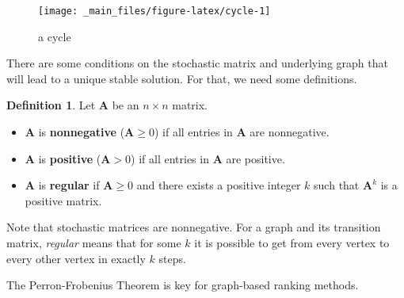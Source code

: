 \documentclass[
]{book}
\theoremstyle{definition}
\newtheorem{definition}{Definition}[chapter]
\theoremstyle{definition}
\theoremstyle{definition}
\theoremstyle{definition}
\theoremstyle{remark}
\begin{document}
\begin{figure}

{\centering \texttt{[image: \_main\_files/figure-latex/cycle-1]} 

}

\caption{a cycle}\label{fig:cycle}
\end{figure}

There are some conditions on the stochastic matrix and underlying graph that will lead to a unique stable solution. For that, we need some definitions.

\begin{defbox}

\begin{definition}

Let \(\mathbf{A}\) be an \(n\times n\) matrix.

\begin{itemize}
\item
  \(\mathbf{A}\) is \textbf{nonnegative} (\(\mathbf{A}\geq 0\)) if all entries in \(\mathbf{A}\) are nonnegative.
\item
  \(\mathbf{A}\) is \textbf{positive} (\(\mathbf{A}>0\)) if all entries in \(\mathbf{A}\) are positive.
\item
  \(\mathbf{A}\) is \textbf{regular} if \(\mathbf{A}\geq 0\) and there exists a positive integer \(k\) such that \(\mathbf{A}^k\) is a positive matrix.
\end{itemize}

\end{definition}

\end{defbox}

Note that stochastic matrices are nonnegative. For a graph and its transition matrix, \emph{regular} means that for some \(k\) it is possible to get from every vertex to every other vertex in exactly \(k\) steps.

The Perron-Frobenius Theorem is key for graph-based ranking methods\autocite{No1}.
\end{document}
